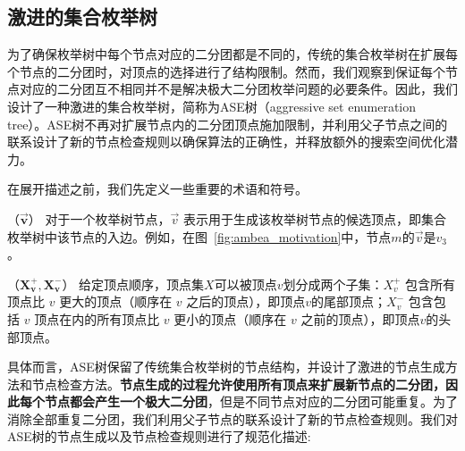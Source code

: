 \subsection{激进的集合枚举树}
\label{subsec:ase}

为了确保枚举树中每个节点对应的二分团都是不同的，传统的集合枚举树在扩展每个节点的二分团时，对顶点的选择进行了结构限制。然而，我们观察到保证每个节点对应的二分团互不相同并不是解决极大二分团枚举问题的必要条件。因此，我们设计了一种激进的集合枚举树，简称为ASE树（aggressive set enumeration tree）。ASE树不再对扩展节点内的二分团顶点施加限制，并利用父子节点之间的联系设计了新的节点检查规则以确保算法的正确性，并释放额外的搜索空间优化潜力。

在展开描述之前，我们先定义一些重要的术语和符号。

\begin{definition}
  $（\vec{\mathbf{v}}）$ 对于一个枚举树节点，$\vec{v}$ 表示用于生成该枚举树节点的候选顶点，即集合枚举树中该节点的入边。例如，在图~\ref{fig:ambea_motivation}中，节点$m$的$\vec{v}$是$v_3$。
\end{definition}

\begin{definition}
  $（\mathbf{X_v^+, X_v^-}）$ 给定顶点顺序，顶点集$X$可以被顶点$v$划分成两个子集：$X_v^+$ 包含所有顶点比 $v$ 更大的顶点（顺序在 $v$ 之后的顶点），即顶点$v$的尾部顶点；$X_v^-$ 包含包括 $v$ 顶点在内的所有顶点比 $v$ 更小的顶点（顺序在 $v$ 之前的顶点），即顶点$v$的头部顶点。
\end{definition}


具体而言，ASE树保留了传统集合枚举树的节点结构，并设计了激进的节点生成方法和节点检查方法。\textbf{节点生成的过程允许使用所有顶点来扩展新节点的二分团，因此每个节点都会产生一个极大二分团}，但是不同节点对应的二分团可能重复。为了消除全部重复二分团，我们利用父子节点的联系设计了新的节点检查规则。我们对ASE树的节点生成以及节点检查规则进行了规范化描述:

